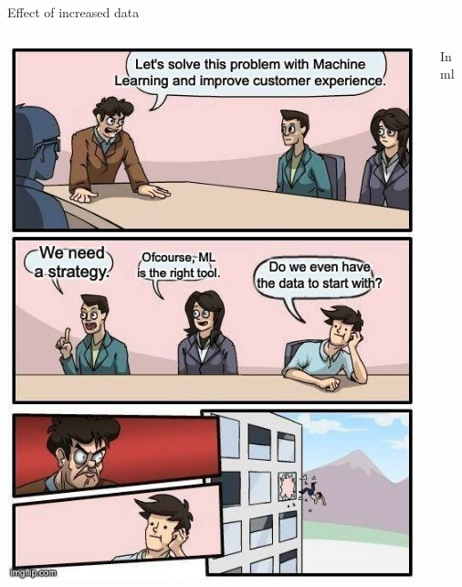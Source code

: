 
\begin{frame}[t]{Effect of increased data}

    \vspace{-0.3cm}
    \begin{columns}
        \begin{column}{0.50\textwidth}
         \begin{center}
          \includegraphics[width=0.99\textwidth]{./images/memes/do_we_even_have_data.png}
        \end{center}  
        \end{column}
        \begin{column}{0.50\textwidth}
            In     \gls{ml}
            {\scriptsize 
            \color{col:attribution} 
            }
        \end{column}
    \end{columns}

\end{frame}


